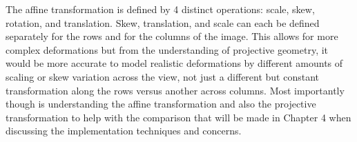 %
%
%
%
%
%

%
%
%



The affine transformation is defined by 4 distinct operations: scale, skew, rotation, and translation. Skew, translation, and scale can each be defined separately for the rows and for the columns of the image. This allows for more complex deformations but from the understanding of projective geometry, it would be more accurate to model realistic deformations by different amounts of scaling or skew variation across the view, not just a different but constant transformation along the rows versus another across columns. Most importantly though is understanding the affine transformation and also the projective transformation to help with the comparison that will be made in Chapter 4 when discussing the implementation techniques and concerns.





